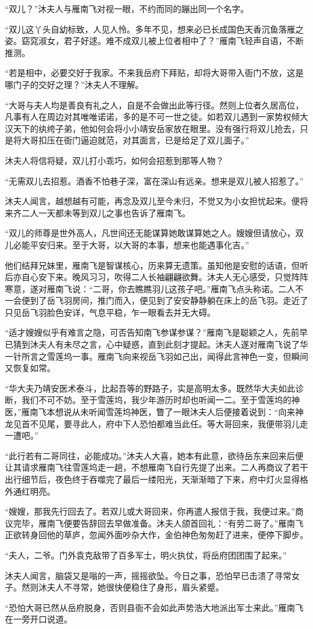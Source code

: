 “双儿？”沐夫人与雁南飞对视一眼，不约而同的蹦出同一个名字。

“双儿这丫头自幼标致，人见人怜。多年不见，想来必已长成国色天香沉鱼落雁之姿。窈窕淑女，君子好逑。难不成双儿被上位者相中了？”雁南飞轻声自语，不断推测。

“若是相中，必要交好于我家。不来我岳府下拜贴，却将大哥带入衙门不放，这是哪门子的交好之理？”沐夫人不理解。

“大哥与夫人均是善良有礼之人，自是不会做出此等行径。然则上位者久居高位，凡事有人在周边对其唯唯诺诺，多的是不可一世之徒。如若双儿遇到一家势权倾大汉天下的纨绔子弟，他如何会将小小靖安岳家放在眼里。没有强行将双儿抢去，只是将大哥扣压在衙门逼迫就范，对其面言，已是给足了双儿面子。”

沐夫人将信将疑，双儿打小乖巧，如何会招惹到那等人物？

“无需双儿去招惹。酒香不怕巷子深，富在深山有远亲。想来是双儿被人招惹了。”

沐夫人闻言，越想越有可能，再念及双儿至今未归，不觉又为小女担忧起来。便将来齐二人一天都未等到双儿之事也告诉了雁南飞。

“双儿的师尊是世外高人，凡世间还无能谋算她敢谋算她之人。嫂嫂但请放心，双儿必能平安归来。至于大哥，以大哥的本事，想来也能遇事化吉。”

他们结拜兄妹里，雁南飞是智谋核心，历来算无遗策。虽知他是安慰的话语，但听后亦自心安下来。晚风习习，吹得二人长袖翩翩欲舞。沐夫人无心感受，只觉阵阵寒意，遂对雁南飞说：“二哥，你去瞧瞧羽儿这孩子吧。”雁南飞点头称诺。二人不一会便到了岳飞羽房间，推门而入，便见到了安安静静躺在床上的岳飞羽。走近了只见岳飞羽脸色安详，气息平稳，乍一眼看去并无大碍。

“适才嫂嫂似乎有难言之隐，可否告知南飞参谋参谋？”雁南飞是聪颖之人，先前早已猜到沐夫人有未尽之言，心中疑惑，直到此刻才提起。沐夫人遂对雁南飞说了华一针所言之雪莲坞一事。雁南飞向来视岳飞羽如己出，闻得此言神色一变，但瞬间又恢复如常。

“华大夫乃靖安医术泰斗，比起吾等的野路子，实是高明太多。既然华大夫如此诊断，我们不可不妨。至于雪莲坞，我少年游历时却也听闻一二。至于雪莲坞的神医，”雁南飞本想说从未听闻雪莲坞神医，瞥了一眼沐夫人后便接着说到：“向来神龙见首不见尾，要寻此人，府中下人恐怕都难当此任。等大哥回来，我便带羽儿走一遭吧。”

“此行若有二哥同往，必能成功。”沐夫人大喜，她本有此意，欲待岳东来回来后便让其请求雁南飞往雪莲坞走一趟，不想雁南飞自行先提了出来。二人再商议了若干出行细节后，夜色终于吞噬完了最后一缕阳光，天渐渐暗了下来，府中灯火显得格外通红明亮。

“嫂嫂，那我先行回去了。若双儿或大哥回来，你再遣人报信于我，我便过来。”商议完毕，雁南飞便要告辞回去早做准备。沐夫人颌首回礼：“有劳二哥了。”雁南飞正欲转身回他的草庐，忽闻外面吵杂大作，金伯神色匆匆赶了进来，便停下脚步。

“夫人，二爷。门外袁克敌带了百多军士，明火执仗，将岳府团团围了起来。”

沐夫人闻言，脑袋又是嗡的一声，摇摇欲坠。今日之事，恐怕早已击溃了寻常女子。然则沐夫人不寻常，她很快便稳住了身形，眉头紧蹙。

“恐怕大哥已然从岳府脱身，否则县衙不会如此声势浩大地派出军士来此。”雁南飞在一旁开口说道。